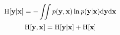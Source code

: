 $$ {\rm H}[{\bf y}|{\bf x}] = - \iint p({\bf y},{\bf x})\ln p({\bf y}|{\bf x}){\rm d}{\bf y}{\rm d}{\bf x} $$
$$ {\rm H}[{\bf y},{\bf x}] = {\rm H}[{\bf y}|{\bf x}] + {\rm H}[{\bf x}]$$
